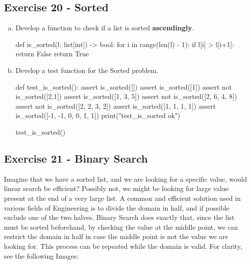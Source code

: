 \documentclass[12pt]{article}
\begin{document}
\subsection*{Exercise 20 - Sorted}
\begin{enumerate}[a)]
  \item Develop a function to check if a list is sorted \textbf{ascendingly}.
\begin{pythonlst}
def is_sorted(l: list[int]) -> bool:
  for i in range(len(l) - 1):
    if l[i] > l[i+1]:
      return False
  return True
\end{pythonlst}
  \item Develop a test function for the Sorted problem.
\begin{pythonlst}
def test_is_sorted():
  assert is_sorted([])
  assert is_sorted([1])
  assert not is_sorted([2,1])
  assert is_sorted([1, 3, 5])
  assert not is_sorted([2, 6, 4, 8])
  assert not is_sorted([2, 2, 3, 2])
  assert is_sorted([1, 1, 1, 1])
  assert is_sorted([-1, -1, 0, 0, 1, 1])
  print("test_is_sorted ok")

test_is_sorted()
\end{pythonlst}
\end{enumerate}
\newpage
\subsection*{Exercise 21 - Binary Search}
Imagine that we have a sorted list, and we are looking for a specific value,
would linear search be efficient? Possibly not, we might be looking for large
value present at the end of a very large list. A common and efficient solution 
used in various fields of Engineering is to divide the domain in half, and if
possible exclude one of the two halves. Binary Search does exactly that, since
the list must be sorted beforehand, by checking the value at the middle point,
we can restrict the domain in half in case the middle point is not the value
we are looking for. This process can be repeated while the domain is valid.
For clarity, see the following Images:
\end{document}
